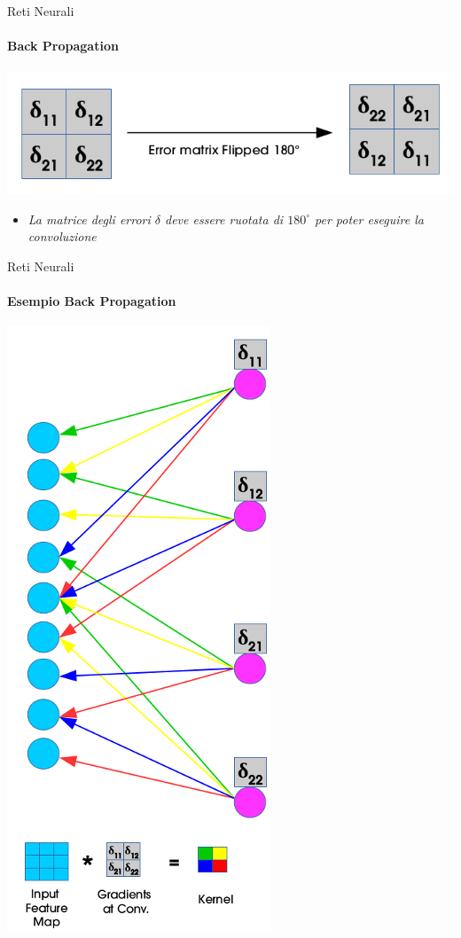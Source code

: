 \documentclass[
 ]{beamer}
\begin{document}
\begin{frame}{Reti Neurali}
    \framesubtitle{Back Propagation} 
    
    \bigskip
    
    \begin{center}
      \includegraphics[scale = 0.6]{back_flipped.png}
    \end{center}
  
    \bigskip \smallskip
        
    \begin{itemize}
        \setlength\itemsep{1em}
        \item[] \large \emph{La matrice degli errori $\delta$ deve essere ruotata di $180^\circ$ per poter eseguire la convoluzione}
    \end{itemize}
\end{frame}

\begin{frame}{Reti Neurali}
    \framesubtitle{Esempio Back Propagation} 
    
    \begin{center}
      \includegraphics[scale = 0.4]{back_conv4.png}
    \end{center}
\end{frame}
\end{document}
